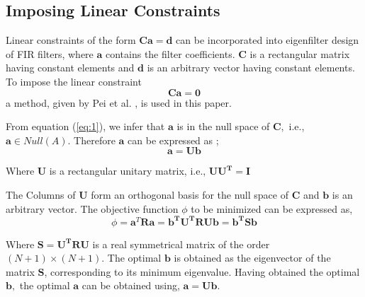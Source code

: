 \subsection{\label{sub:Imposing-Linear-constraints}Imposing Linear Constraints}

Linear constraints of the form $\mathbf{C}\mathbf{a}=\mathbf{d}$
can be incorporated into eigenfilter design of FIR filters, where $\mathbf{a}$
contains the filter coefficients. $\mathbf{C}$ is a rectangular matrix
having constant elements and $\mathbf{d}$ is an arbitrary vector
having constant elements. To impose the linear constraint \begin{equation}
\mathbf{C}\mathbf{a}=\mathbf{0}\label{eq:1}\end{equation}
a method, given by Pei et al. \cite{key-44}, is used in this
paper.

From equation (\ref{eq:1}), we infer that $\mathbf{a}$ is in the
null space of $\mathbf{C,}$ i.e., $\mathbf{a}\in Null(A).$ Therefore
$\mathbf{a}$ can be expressed as \cite{key-31};
\begin{equation}
\mathbf{a}=\mathbf{U}\mathbf{b}
\end{equation}

Where $\mathbf{U}$ is a rectangular unitary matrix, i.e., $ \mathbf{UU^{T}}=\mathbf{I} $


The Columns of $\mathbf{U}$ form an orthogonal basis for the null
space of $\mathbf{C}$ and $\mathbf{b}$ is an arbitrary vector. The
objective function $\phi$ to be minimized can be expressed as,
\begin{equation}
\phi=\mathbf{a}^{T}\mathbf{R}\mathbf{a=\mathbf{b}^{T}\mathbf{U^{T}RU}\mathbf{b}=\mathbf{b^{T}S}\mathbf{b}}
\end{equation}

Where $\mathbf{S=U^{T}RU}$ is a real symmetrical matrix of the
order $(N+1)\times(N+1)$. The optimal $\mathbf{b}$ is obtained as
the eigenvector of the matrix $\mathbf{S}$, corresponding to its
minimum eigenvalue. Having obtained the optimal $\mathbf{b},$ the optimal
$\mathbf{a}$ can be obtained using, $\mathbf{a}=\mathbf{U}\mathbf{b}$.
